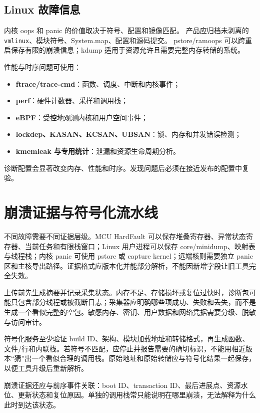 \subsection{Linux 故障信息}

内核 oops 和 panic 的价值取决于符号、配置和镜像匹配。
产品应归档未剥离的 \texttt{vmlinux}、模块符号、System.map、配置和源码提交。
pstore/ramoops 可以跨重启保存有限的崩溃信息\cite{linux-pstore}；kdump 适用于资源允许且需要完整内存转储的系统\cite{linux-kdump-doc}。

性能与时序问题可使用：
\begin{itemize}
  \item \textbf{ftrace/trace-cmd}：函数、调度、中断和内核事件\cite{linux-ftrace-doc}；
  \item \textbf{perf}：硬件计数器、采样和调用栈；
  \item \textbf{eBPF}：受控地观测内核和用户空间事件；
  \item \textbf{lockdep、KASAN、KCSAN、UBSAN}：锁、内存和并发错误检测；
  \item \textbf{kmemleak 与专用统计}：泄漏和资源生命周期分析。
\end{itemize}

诊断配置会显著改变内存、性能和时序。发现问题后必须在接近发布的配置中复验。

\section{崩溃证据与符号化流水线}

不同故障需要不同证据层级。MCU HardFault 可以保存堆叠寄存器、异常状态寄存器、当前任务和有限栈窗口；Linux 用户进程可以保存 core/minidump、映射表与线程栈；内核 panic 可使用 pstore 或 capture kernel；远端核则需要独立 panic 区和主核导出路径。证据格式应版本化并能部分解析，不能因新增字段让旧工具完全失效。

上传前先生成摘要并记录采集状态。内存不足、存储损坏或复位过快时，诊断包可能只包含部分线程或被截断日志；采集器应明确哪些项成功、失败和丢失，而不是生成一个看似完整的空包。敏感内存、密钥、用户数据和网络凭据需要分级、脱敏与访问审计。

符号化服务至少验证 build ID、架构、模块加载地址和转储格式，再生成函数、文件/行和内联栈。若符号不匹配，应停止并报告需要的确切标识，不能用相近版本“猜”出一个看似合理的调用栈。原始地址和原始转储应与符号化结果一起保存，以便工具升级后重新解析。

崩溃证据还应与前序事件关联：boot ID、transaction ID、最后进展点、资源水位、更新状态和复位原因。单独的调用栈常只能说明在哪里崩溃，无法解释为什么此时到达该状态。

